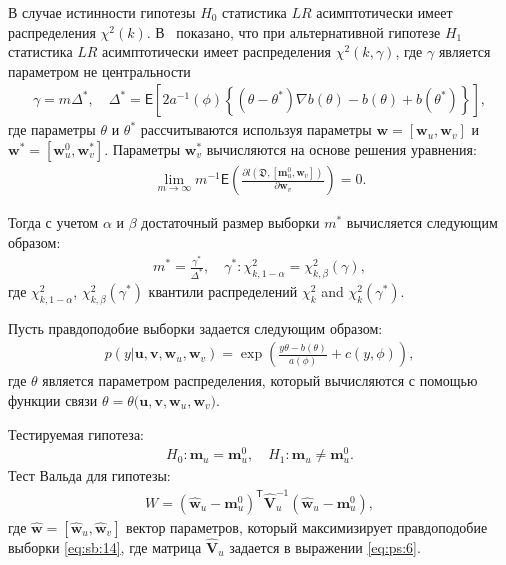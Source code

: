В случае истинности гипотезы $H_0$ статистика $LR$ асимптотически имеет распределения $\chi^2(k)$.  В~\cite{shieh2000} показано, что при альтернативной гипотезе $H_1$ статистика  $LR$ асимптотически имеет распределения $\chi^2(k,\gamma)$, где $\gamma$ является параметром не центральности
\[
\label{eq:sb:11}
\begin{aligned}
	\gamma = m\Delta^*, \quad \Delta^* = \mathsf{E}\left[2a^{-1}(\phi)\left\{\left(\theta - \theta^*\right)\nabla b(\theta) - b(\theta) + b(\theta^*)\right\}\right], 
\end{aligned}
\]
где параметры $\theta$ и $\theta^*$ рассчитываются используя параметры $\textbf{w} = [\textbf{w}_{u}, \textbf{w}_{v}]$ и $\textbf{w}^* = [\textbf{w}^{0}_{u}, \textbf{w}^{*}_{v}]$. Параметры $\textbf{w}^{*}_{v}$ вычисляются на основе решения уравнения:
\[
\label{eq:sb:12}
\begin{aligned}
	\lim_{m\to\infty}m^{-1}\mathsf{E}\left(\frac{\partial l\left(\mathfrak{D}, \left[\textbf{m}^{0}_{u}, \textbf{w}_{v}\right]\right)}{\partial \textbf{w}_{v}}\right) = 0.
\end{aligned}
\]
	
Тогда с учетом $\alpha$ и $\beta$ достаточный размер выборки  $m^*$ вычисляется следующим образом:
\[
\label{eq:sb:13}
\begin{aligned}
	m^* = \frac{\gamma^*}{\Delta^*}, \quad \gamma^*:\chi^2_{k, 1-\alpha} = \chi^2_{k, \beta}\left(\gamma\right), 
\end{aligned}
\]
где $\chi^2_{k, 1-\alpha}$, $\chi^2_{k, \beta}\left(\gamma^*\right)$ квантили распределений $\chi^{2}_k$ and $\chi^2_{k}\left(\gamma^*\right)$.
	
Пусть правдоподобие выборки задается следующим образом:
\[
\label{eq:sb:14}
\begin{aligned}
	p(y|\textbf{u},\textbf{v},\textbf{w}_{u},\textbf{w}_{v}) = \exp\left(\frac{y\theta- b(\theta)}{a(\phi)} + c\left(y, \phi\right)\right),
\end{aligned}
\]
где $\theta$ является параметром распределения, который вычисляются с помощью функции связи $\theta=\theta\bigr(\textbf{u},\textbf{v},\textbf{w}_{u},\textbf{w}_{v}\bigr)$.

Тестируемая гипотеза:
\[
\label{eq:sb:15}
\begin{aligned}
	H_0: \textbf{m}_{u} = \textbf{m}_{u}^{0}, \quad H_1: \textbf{m}_{u} \not=\textbf{m}_{u}^{0}.
\end{aligned}
\]
Тест Вальда для гипотезы:
\[
\label{eq:sb:16}
\begin{aligned}
	W = \left(\hat{\textbf{w}}_{u} - \textbf{m}_{u}^{0}\right)^{\mathsf{T}}\hat{\textbf{V}}_{u}^{-1}\left(\hat{\textbf{w}}_{u} - \textbf{m}_{u}^{0}\right),
\end{aligned}
\]
где $\hat{\textbf{w}} = [\hat{\textbf{w}}_{u},\hat{\textbf{w}}_{v}]$ вектор параметров, который максимизирует правдоподобие выборки \eqref{eq:sb:14}, где матрица $\hat{\textbf{V}}_u$ задается в выражении \eqref{eq:ps:6}.

